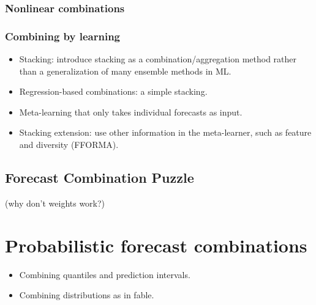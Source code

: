 \documentclass[11pt]{article}
\begin{document}
\subsubsection{Nonlinear combinations}


\subsubsection{Combining by learning}
\begin{itemize}
 \item Stacking: introduce stacking as a combination/aggregation method rather than a generalization of many ensemble methods in ML.
 \item Regression-based combinations: a simple stacking.
 \item Meta-learning that only takes individual forecasts as input.
 \item Stacking extension: use other information in the meta-learner, such as feature and diversity (FFORMA).
\end{itemize}

\subsection{Forecast Combination Puzzle}
{\color{red} (why don't weights work?)}

\citep{De_Menezes2000-vd,Genre2013-ut,Post2019-lv,Chan2018-jl,Lichtendahl2020-ut,Kourentzes2019-na}


\section{Probabilistic forecast combinations}
\begin{itemize}
\item Combining quantiles and prediction intervals.
\item Combining distributions as in fable.
\end{itemize}
\end{document}
